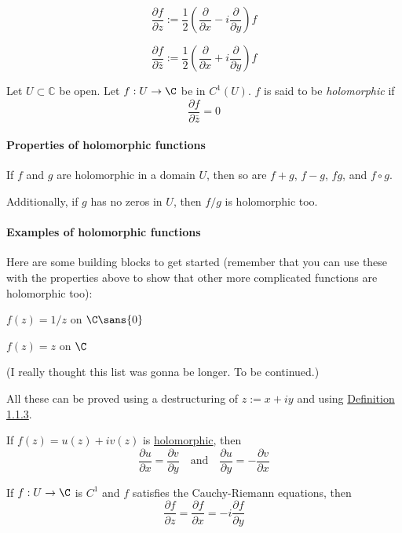 $$
  \frac{\partial f}{\partial z} :=
  \frac12\left(
  \frac{\partial}{\partial x}-i\frac{\partial}{\partial y}
  \right)f
$$

$$
  \frac{\partial f}{\partial\bar z} :=
  \frac12\left(
  \frac{\partial}{\partial x}+i\frac{\partial}{\partial y}
  \right)f
$$

\label{e1e08f7}

Let $U\subset\mathbb C$ be open. Let $f:U\to\C$ be in $C^1(U)$. $f$ is said to
be \textit{holomorphic} if
$$
  \frac{\partial f}{\partial\bar z}=0
$$

\paragraph{Properties of holomorphic functions} If $f$ and $g$ are holomorphic in a domain $U$, then so are $f+g$, $f-g$, $fg$,
and $f\circ g$.

Additionally, if $g$ has no zeros in $U$, then $f/g$ is holomorphic too.

\paragraph{Examples of holomorphic functions}

Here are some building blocks to get started (remember that you can use these
with the properties above to show that other more complicated functions are
holomorphic too):

\begin{enumerati}
  \item $f(z)=1/z$ on $\C\sans{0}$
  \item $f(z)=z$ on $\C$
\end{enumerati}

(I really thought this list was gonna be longer. To be continued.)

All these can be proved using a destructuring of $z:=x+iy$ and using
\href{ffea0ed}{Definition 1.1.3}.

\label{fb10fd3}

If $f(z) = u(z) + iv(z)$ is \href{e1e08f7}{holomorphic}, then
$$
  \frac{\partial u}{\partial x}=\frac{\partial v}{\partial y}
  \quad\text{and}\quad
  \frac{\partial u}{\partial y}=-\frac{\partial v}{\partial x}
$$

\label{d507f47}

If $f:U\to\C$ is $C^1$ and $f$ satisfies the Cauchy-Riemann equations, then
$$
  \frac{\partial f}{\partial z}=\frac{\partial f}{\partial x}=
  -i\frac{\partial f}{\partial y}
$$

